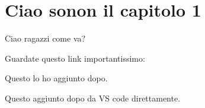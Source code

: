 \chapter{Ciao sonon il capitolo 1}

Ciao ragazzi come va?

Guardate questo link importantissimo: \cite{provaBibliografia}


Questo lo ho aggiunto dopo.

Questo aggiunto dopo da VS code direttamente.